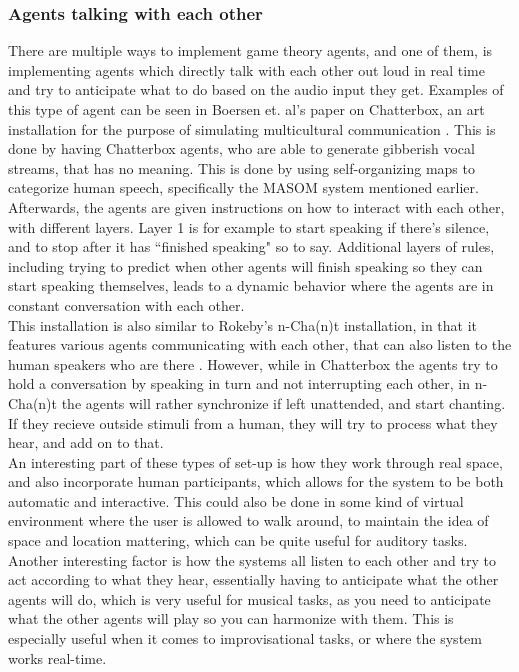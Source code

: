 \documentclass[a4paper,english]{report}
\begin{document}
	\subsubsection{Agents talking with each other}
	There are multiple ways to implement game theory agents, and one of them, is implementing agents which directly talk with each other out loud in real time and try to anticipate what to do based on the audio input they get. Examples of this type of agent can be seen in Boersen et. al's paper on Chatterbox, an art installation for the purpose of simulating multicultural communication \cite{boersen2020chatterbox}. This is done by having Chatterbox agents, who are able to generate gibberish vocal streams, that has no meaning. This is done by using self-organizing maps to categorize human speech, specifically the MASOM system mentioned earlier. Afterwards, the agents are given instructions on how to interact with each other, with different layers. Layer 1 is for example to start speaking if there's silence, and to stop after it has ``finished speaking" so to say. Additional layers of rules, including trying to predict when other agents will finish speaking so they can start speaking themselves, leads to a dynamic behavior where the agents are in constant conversation with each other. \\
	This installation is also similar to Rokeby's n-Cha(n)t installation, in that it features various agents communicating with each other, that can also listen to the human speakers who are there \cite{rokeby2001nchant}. However, while in Chatterbox the agents try to hold a conversation by speaking in turn and not interrupting each other, in n-Cha(n)t the agents will rather synchronize if left unattended, and start chanting. If they recieve outside stimuli from a human, they will try to process what they hear, and add on to that. \\
	An interesting part of these types of set-up is how they work through real space, and also incorporate human participants, which allows for the system to be both automatic and interactive. This could also be done in some kind of virtual environment where the user is allowed to walk around, to maintain the idea of space and location mattering, which can be quite useful for auditory tasks. Another interesting factor is how the systems all listen to each other and try to act according to what they hear, essentially having to anticipate what the other agents will do, which is very useful for musical tasks, as you need to anticipate what the other agents will play so you can harmonize with them. This is especially useful when it comes to improvisational tasks, or where the system works real-time.
	
\end{document}
